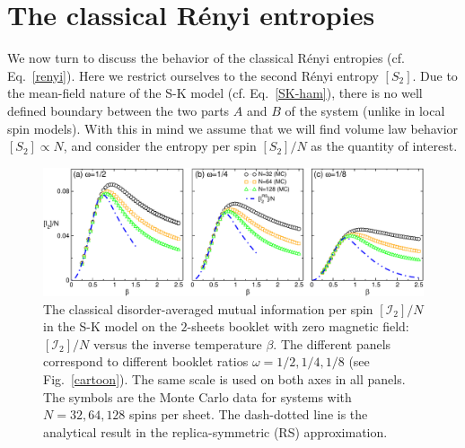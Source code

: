 \documentclass[twocolumn,superscriptaddress,prb,10pt]{revtex4-1}
\begin{document}
\section{The classical R\'enyi entropies}
\label{Renyi-section}

We now turn to discuss the behavior of the classical R\'enyi entropies 
(cf. Eq.~\eqref{renyi}). Here we restrict ourselves to the second R\'enyi 
entropy $[S_2]$. Due to the mean-field nature of the S-K model (cf. Eq.~\eqref{SK-ham}), 
there is no well defined boundary between the two parts $A$ and $B$ of the system 
(unlike in local spin models). With this in mind we assume that we will find volume law 
behavior $[S_2]\propto N$, and consider the entropy per spin 
$[S_2]/N$ as the quantity of interest. 

\begin{figure}[t]
\includegraphics*[width=0.93\linewidth]{./draft_figs/I2_MC_v1}
\caption{The classical disorder-averaged mutual information per spin $[{\mathcal I}_2]/N$ 
 in the S-K model on the $2$-sheets booklet with zero magnetic field: 
 $[{\mathcal I}_2]/N$ versus the inverse temperature $\beta$. The 
 different panels correspond to different booklet ratios $\omega=1/2,1/4,1/8$ 
 (see Fig.~\ref{cartoon}). The same scale is used on both axes in all 
 panels. The symbols are the Monte Carlo data 
 for systems with $N=32,64,128$ spins per sheet. The dash-dotted line is 
 the analytical result in the replica-symmetric (RS) approximation.  
}
\label{I2-MC}
\end{figure}
\end{document}
